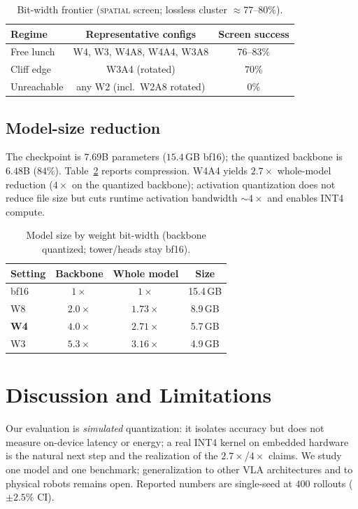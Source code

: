 \documentclass[conference]{IEEEtran}
\begin{document}
\begin{table}[h]\centering
\caption{Bit-width frontier (\textsc{spatial} screen; lossless cluster $\approx 77$--$80\%$).}
\label{tab:frontier}
\begin{tabular}{lcc}
\toprule
Regime & Representative configs & Screen success \\
\midrule
Free lunch & W4, W3, W4A8, W4A4, W3A8 & $76$--$83\%$ \\
Cliff edge & W3A4 (rotated) & $70\%$ \\
Unreachable & any W2 (incl.\ W2A8 rotated) & $0\%$ \\
\bottomrule
\end{tabular}
\end{table}

\subsection{Model-size reduction}
The checkpoint is $7.69$B parameters ($15.4$\,GB bf16); the quantized backbone is $6.48$B
($84\%$). Table~\ref{tab:size} reports compression. W4A4 yields $2.7\times$ whole-model
reduction ($4\times$ on the quantized backbone); activation quantization does not reduce file
size but cuts runtime activation bandwidth $\sim\!4\times$ and enables INT4 compute.

\begin{table}[h]\centering
\caption{Model size by weight bit-width (backbone quantized; tower/heads stay bf16).}
\label{tab:size}
\begin{tabular}{lccc}
\toprule
Setting & Backbone & Whole model & Size \\
\midrule
bf16 & $1\times$ & $1\times$ & 15.4\,GB \\
W8 & $2.0\times$ & $1.73\times$ & 8.9\,GB \\
\textbf{W4} & $4.0\times$ & $2.71\times$ & 5.7\,GB \\
W3 & $5.3\times$ & $3.16\times$ & 4.9\,GB \\
\bottomrule
\end{tabular}
\end{table}

\section{Discussion and Limitations}
Our evaluation is \emph{simulated} quantization: it isolates accuracy but does not measure
on-device latency or energy; a real INT4 kernel on embedded hardware is the natural next
step and the realization of the $2.7\times$/$4\times$ claims. We study one model and one
benchmark; generalization to other VLA architectures and to physical robots remains open.
Reported numbers are single-seed at $400$ rollouts ($\pm2.5\%$ CI).
\end{document}
